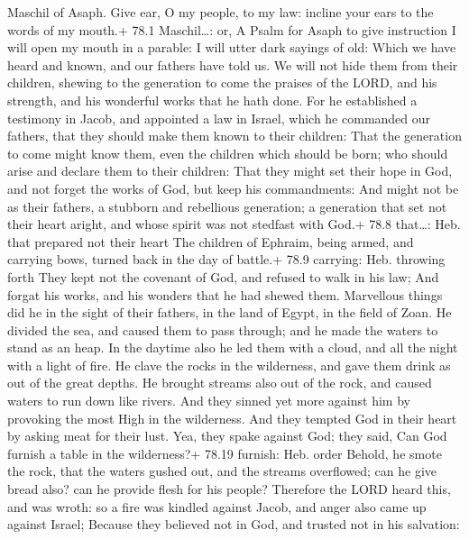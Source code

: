 Maschil of Asaph.  Give ear, O my people, to my law: incline
your ears to the words of my mouth.+ 78.1 Maschil\ldots: or, A Psalm for
Asaph to give instruction  I will open my mouth in a
parable: I will utter dark sayings of old:  Which we have
heard and known, and our fathers have told us.  We will not
hide them from their children, shewing to the generation to come the
praises of the LORD, and his strength, and his wonderful works that he
hath done.  For he established a testimony in Jacob, and
appointed a law in Israel, which he commanded our fathers, that they
should make them known to their children:  That the
generation to come might know them, even the children which should be
born; who should arise and declare them to their children: 
That they might set their hope in God, and not forget the works of God,
but keep his commandments:  And might not be as their
fathers, a stubborn and rebellious generation; a generation that set not
their heart aright, and whose spirit was not stedfast with God.+ 78.8
that\ldots: Heb. that prepared not their heart  The children
of Ephraim, being armed, and carrying bows, turned back in the day of
battle.+ 78.9 carrying: Heb. throwing forth  They kept not
the covenant of God, and refused to walk in his law;  And
forgat his works, and his wonders that he had shewed them. 
Marvellous things did he in the sight of their fathers, in the land of
Egypt, in the field of Zoan.  He divided the sea, and
caused them to pass through; and he made the waters to stand as an heap.
 In the daytime also he led them with a cloud, and all the
night with a light of fire.  He clave the rocks in the
wilderness, and gave them drink as out of the great depths.
 He brought streams also out of the rock, and caused waters
to run down like rivers.  And they sinned yet more against
him by provoking the most High in the wilderness.  And they
tempted God in their heart by asking meat for their lust. 
Yea, they spake against God; they said, Can God furnish a table in the
wilderness?+ 78.19 furnish: Heb. order  Behold, he smote
the rock, that the waters gushed out, and the streams overflowed; can he
give bread also? can he provide flesh for his people? 
Therefore the LORD heard this, and was wroth: so a fire was kindled
against Jacob, and anger also came up against Israel; 
Because they believed not in God, and trusted not in his salvation:
